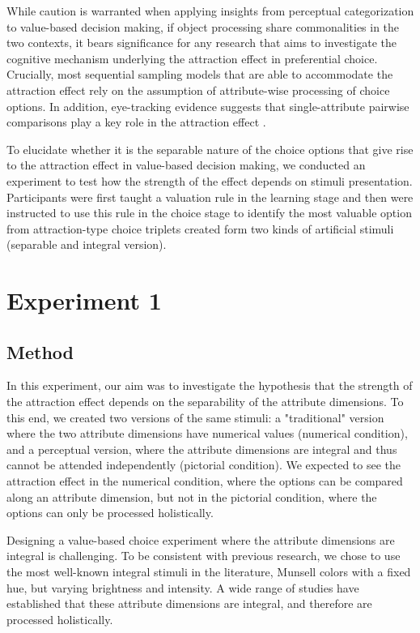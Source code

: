 \documentclass[11pt,a4paper]{article}
\begin{document}
While caution is warranted when applying insights from perceptual categorization to value-based decision making, if object processing share commonalities in the two contexts, it bears significance for any research that aims to investigate the cognitive mechanism underlying the attraction effect in preferential choice.   Crucially, most sequential sampling models that are able to accommodate the attraction effect rely on the assumption of attribute-wise processing of choice options. In addition, eye-tracking evidence suggests that single-attribute pairwise comparisons play a key role in the attraction effect \cite{Noguchi2014}.

To elucidate whether it is the separable nature of the choice options that give rise to the attraction effect in value-based decision making, we conducted an experiment to test how the strength of the effect depends on stimuli presentation. Participants were first taught a valuation rule in the learning stage and then were instructed to use this rule in the choice stage to identify the most valuable option from attraction-type choice triplets created form two kinds of artificial stimuli (separable and integral version). 

\section{Experiment 1} 


\subsection{Method}

In this experiment, our aim was to investigate the hypothesis that the strength of the attraction effect depends on the separability of the attribute dimensions. To this end, we created two versions of the same stimuli: a "traditional" version where the two attribute dimensions have numerical values (numerical condition), and a perceptual version, where the attribute dimensions are integral and thus cannot be attended independently (pictorial condition). We expected to see the attraction effect in the numerical condition, where the options can be compared along an attribute dimension, but not in the pictorial condition, where the options can only be processed holistically.

Designing a value-based choice experiment where the attribute dimensions are integral is challenging. To be consistent with previous research, we chose to use the most well-known integral stimuli in the literature, Munsell colors with a fixed hue, but varying brightness and intensity. A wide range of studies have established that these attribute dimensions are integral, and therefore are processed holistically. 
\end{document}
